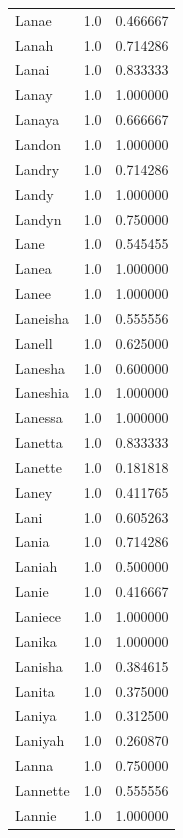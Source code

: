 \documentclass[
  letterpaper,
  DIV=11,
  numbers=noendperiod]{scrreprt}
\begin{document}
\begin{tabular}{lrr}
Lanae           &   1.0 &   0.466667 \\
Lanah           &   1.0 &   0.714286 \\
Lanai           &   1.0 &   0.833333 \\
Lanay           &   1.0 &   1.000000 \\
Lanaya          &   1.0 &   0.666667 \\
Landon          &   1.0 &   1.000000 \\
Landry          &   1.0 &   0.714286 \\
Landy           &   1.0 &   1.000000 \\
Landyn          &   1.0 &   0.750000 \\
Lane            &   1.0 &   0.545455 \\
Lanea           &   1.0 &   1.000000 \\
Lanee           &   1.0 &   1.000000 \\
Laneisha        &   1.0 &   0.555556 \\
Lanell          &   1.0 &   0.625000 \\
Lanesha         &   1.0 &   0.600000 \\
Laneshia        &   1.0 &   1.000000 \\
Lanessa         &   1.0 &   1.000000 \\
Lanetta         &   1.0 &   0.833333 \\
Lanette         &   1.0 &   0.181818 \\
Laney           &   1.0 &   0.411765 \\
Lani            &   1.0 &   0.605263 \\
Lania           &   1.0 &   0.714286 \\
Laniah          &   1.0 &   0.500000 \\
Lanie           &   1.0 &   0.416667 \\
Laniece         &   1.0 &   1.000000 \\
Lanika          &   1.0 &   1.000000 \\
Lanisha         &   1.0 &   0.384615 \\
Lanita          &   1.0 &   0.375000 \\
Laniya          &   1.0 &   0.312500 \\
Laniyah         &   1.0 &   0.260870 \\
Lanna           &   1.0 &   0.750000 \\
Lannette        &   1.0 &   0.555556 \\
Lannie          &   1.0 &   1.000000 \\

\end{tabular}
\end{document}
